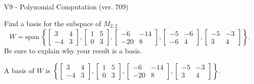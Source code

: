 \begin{exercise}
  \begin{exerciseTitle}V9 - Polynomial Computation (ver. 709)\end{exerciseTitle}
  \begin{exerciseStatement}
    Find a basis for the subspace of \(M_{2,2}\) 
\[W=\mathrm{span}\ \left\{\left[\begin{array}{cc}
3 & 4 \\
-4 & 3
\end{array}\right] , \left[\begin{array}{cc}
1 & 5 \\
0 & 3
\end{array}\right] , \left[\begin{array}{cc}
-6 & -14 \\
-20 & 8
\end{array}\right] , \left[\begin{array}{cc}
-5 & -6 \\
-6 & 4
\end{array}\right] , \left[\begin{array}{cc}
-5 & -3 \\
3 & 4
\end{array}\right]\right\}.\]
 Be sure to explain why your result is a basis.


  \end{exerciseStatement}
  \begin{exerciseAnswer}
   A basis of \(W\) is  \(\left\{\left[\begin{array}{cc}
3 & 4 \\
-4 & 3
\end{array}\right] , \left[\begin{array}{cc}
1 & 5 \\
0 & 3
\end{array}\right] , \left[\begin{array}{cc}
-6 & -14 \\
-20 & 8
\end{array}\right] , \left[\begin{array}{cc}
-5 & -3 \\
3 & 4
\end{array}\right]\right\}\).
  


  \end{exerciseAnswer}
\end{exercise}